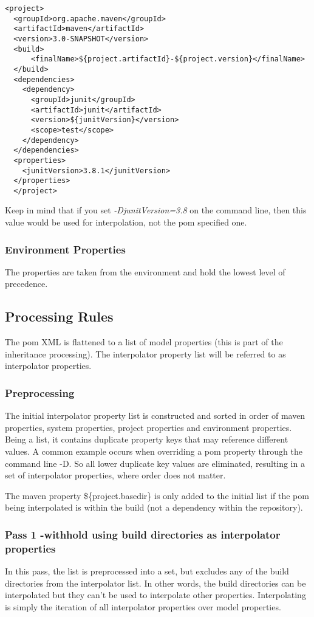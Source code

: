 \documentclass[12pt]{amsart}
\begin{document}
\begin{verbatim}
<project>
  <groupId>org.apache.maven</groupId>
  <artifactId>maven</artifactId>
  <version>3.0-SNAPSHOT</version>
  <build>
      <finalName>${project.artifactId}-${project.version}</finalName>
  </build>
  <dependencies>
    <dependency>
      <groupId>junit</groupId>
      <artifactId>junit</artifactId>
      <version>${junitVersion}</version>
      <scope>test</scope>
    </dependency>
  </dependencies>
  <properties>
    <junitVersion>3.8.1</junitVersion>
  </properties>
  </project>
\end{verbatim}

Keep in mind that if you set  \emph{-DjunitVersion=3.8} on the command line, then this value would be used for interpolation, not the pom specified one.

\subsubsection{Environment Properties}
The properties are taken from the environment and hold the lowest level of precedence.

\subsection{Processing Rules}
The pom XML is flattened to a list of model properties (this is part of the inheritance processing). The interpolator property list will be referred to as interpolator properties.
 
\subsubsection{Preprocessing}
The initial interpolator property list is constructed and sorted in order of maven properties, system properties, project properties and environment properties. Being a list, it contains duplicate property keys that may reference different values. A common example occurs when overriding a pom property through the command line -D. So all lower duplicate key values are eliminated, resulting in a set of interpolator properties, where order does not matter.

The maven property \$\{project.basedir\} is only added to the initial list if the pom being interpolated is within the build (not a dependency within the repository).

\subsubsection{Pass 1 -withhold using build directories as interpolator properties} In this pass, the list is preprocessed into a set, but excludes  any of the build directories from the interpolator list. In other words, the build directories can be interpolated but they can't be used to interpolate other properties. Interpolating is simply the iteration of all interpolator properties over model properties.
\end{document}
